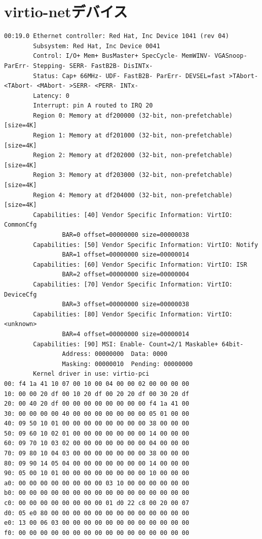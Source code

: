 \documentclass[a4paper,11pt,report]{ltjsbook}
\begin{document}
\section{virtio-netデバイス}
\begin{verbatim}
00:19.0 Ethernet controller: Red Hat, Inc Device 1041 (rev 04)
        Subsystem: Red Hat, Inc Device 0041
        Control: I/O+ Mem+ BusMaster+ SpecCycle- MemWINV- VGASnoop- ParErr- Stepping- SERR- FastB2B- DisINTx-
        Status: Cap+ 66MHz- UDF- FastB2B- ParErr- DEVSEL=fast >TAbort- <TAbort- <MAbort- >SERR- <PERR- INTx-
        Latency: 0
        Interrupt: pin A routed to IRQ 20
        Region 0: Memory at df200000 (32-bit, non-prefetchable) [size=4K]
        Region 1: Memory at df201000 (32-bit, non-prefetchable) [size=4K]
        Region 2: Memory at df202000 (32-bit, non-prefetchable) [size=4K]
        Region 3: Memory at df203000 (32-bit, non-prefetchable) [size=4K]
        Region 4: Memory at df204000 (32-bit, non-prefetchable) [size=4K]
        Capabilities: [40] Vendor Specific Information: VirtIO: CommonCfg
                BAR=0 offset=00000000 size=00000038
        Capabilities: [50] Vendor Specific Information: VirtIO: Notify
                BAR=1 offset=00000000 size=00000014
        Capabilities: [60] Vendor Specific Information: VirtIO: ISR
                BAR=2 offset=00000000 size=00000004
        Capabilities: [70] Vendor Specific Information: VirtIO: DeviceCfg
                BAR=3 offset=00000000 size=00000038
        Capabilities: [80] Vendor Specific Information: VirtIO: <unknown>
                BAR=4 offset=00000000 size=00000014
        Capabilities: [90] MSI: Enable- Count=2/1 Maskable+ 64bit-
                Address: 00000000  Data: 0000
                Masking: 00000010  Pending: 00000000
        Kernel driver in use: virtio-pci
00: f4 1a 41 10 07 00 10 00 04 00 00 02 00 00 00 00
10: 00 00 20 df 00 10 20 df 00 20 20 df 00 30 20 df
20: 00 40 20 df 00 00 00 00 00 00 00 00 f4 1a 41 00
30: 00 00 00 00 40 00 00 00 00 00 00 00 05 01 00 00
40: 09 50 10 01 00 00 00 00 00 00 00 00 38 00 00 00
50: 09 60 10 02 01 00 00 00 00 00 00 00 14 00 00 00
60: 09 70 10 03 02 00 00 00 00 00 00 00 04 00 00 00
70: 09 80 10 04 03 00 00 00 00 00 00 00 38 00 00 00
80: 09 90 14 05 04 00 00 00 00 00 00 00 14 00 00 00
90: 05 00 10 01 00 00 00 00 00 00 00 00 10 00 00 00
a0: 00 00 00 00 00 00 00 00 03 10 00 00 00 00 00 00
b0: 00 00 00 00 00 00 00 00 00 00 00 00 00 00 00 00
c0: 00 00 00 00 00 00 00 00 01 d0 22 c8 00 20 00 07
d0: 05 e0 80 00 00 00 00 00 00 00 00 00 00 00 00 00
e0: 13 00 06 03 00 00 00 00 00 00 00 00 00 00 00 00
f0: 00 00 00 00 00 00 00 00 00 00 00 00 00 00 00 00
\end{verbatim}


\end{document}
